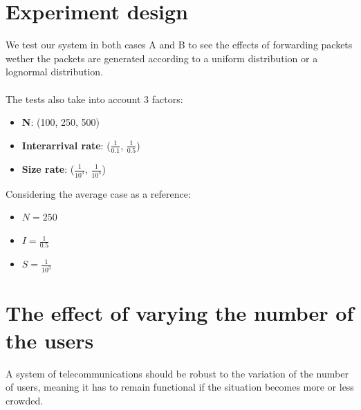 \documentclass{report}
\begin{document}
\section{Experiment design}
We test our system in both cases A and B to see the effects of forwarding packets wether the packets are generated according to a uniform distribution or a lognormal distribution.\\\\
The tests also take into account 3 factors:
\begin{itemize}
    \item \textbf{N}: (100, 250, 500)
    \item \textbf{Interarrival rate}: ($\frac{1}{0.1}$, $\frac{1}{0.5}$)
    \item \textbf{Size rate}: ($\frac{1}{10^3}$, $\frac{1}{10^4}$)
\end{itemize}

Considering the average case as a reference:
\begin{itemize}
    \item $N=250$
    \item $I=\frac{1}{0.5}$
    \item $S=\frac{1}{10^3}$
\end{itemize}

\section{The effect of varying the number of the users}
A system of telecommunications should be robust to the variation of the number of users, meaning it has to remain functional if the situation becomes more or less crowded.
\end{document}
